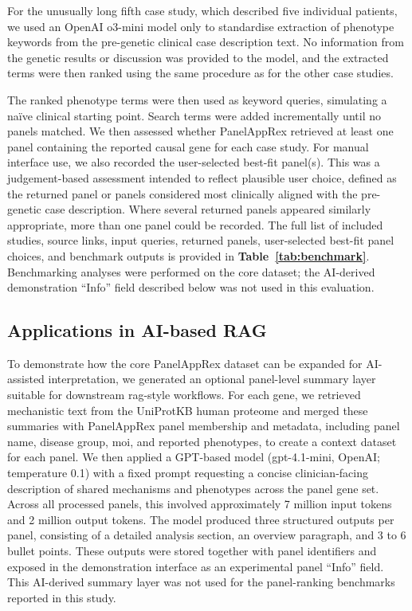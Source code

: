 For the unusually long fifth case study, which described five individual patients, we used an OpenAI o3-mini model only to standardise extraction of phenotype keywords from the pre-genetic clinical case description text. No information from the genetic results or discussion was provided to the model, and the extracted terms were then ranked using the same procedure as for the other case studies.

The ranked phenotype terms were then used as keyword queries, simulating a naïve clinical starting point. Search terms were added incrementally until no panels matched. We then assessed whether PanelAppRex retrieved at least one panel containing the reported causal gene for each case study. For manual interface use, we also recorded the user-selected best-fit panel(s). This was a judgement-based assessment intended to reflect plausible user choice, defined as the returned panel or panels considered most clinically aligned with the pre-genetic case description. Where several returned panels appeared similarly appropriate, more than one panel could be recorded. The full list of included studies, source links, input queries, returned panels, user-selected best-fit panel choices, and benchmark outputs is provided in \textbf{Table~\ref{tab:benchmark}}. Benchmarking analyses were performed on the core dataset; the AI-derived demonstration ``Info'' field described below was not used in this evaluation.

\subsection{Applications in AI-based RAG}
\noindent
To demonstrate how the core PanelAppRex dataset can be expanded for AI-assisted interpretation, we generated an optional panel-level summary layer suitable for downstream \ac{rag}-style workflows. For each gene, we retrieved mechanistic text from the UniProtKB human proteome and merged these summaries with PanelAppRex panel membership and metadata, including panel name, disease group, \ac{moi}, and reported phenotypes, to create a context dataset for each panel. We then applied a GPT-based model (gpt-4.1-mini, OpenAI; temperature 0.1) with a fixed prompt requesting a concise clinician-facing description of shared mechanisms and phenotypes across the panel gene set. Across all processed panels, this involved approximately 7 million input tokens and 2 million output tokens. The model produced three structured outputs per panel, consisting of a detailed analysis section, an overview paragraph, and 3 to 6 bullet points. These outputs were stored together with panel identifiers and exposed in the demonstration interface as an experimental panel ``Info'' field. This AI-derived summary layer was not used for the panel-ranking benchmarks reported in this study.

